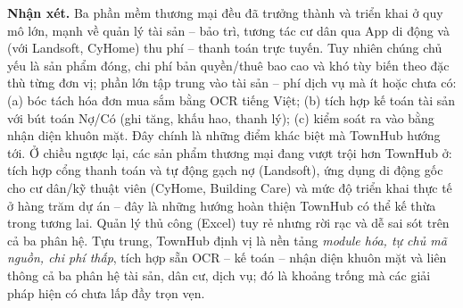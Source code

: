 \textbf{Nhận xét.} Ba phần mềm thương mại đều đã trưởng thành và triển khai ở quy mô lớn, mạnh về quản lý tài sản -- bảo trì, tương tác cư dân qua App di động và (với Landsoft, CyHome) thu phí -- thanh toán trực tuyến. Tuy nhiên chúng chủ yếu là sản phẩm đóng, chi phí bản quyền/thuê bao cao và khó tùy biến theo đặc thù từng đơn vị; phần lớn tập trung vào tài sản -- phí dịch vụ mà ít hoặc chưa có: (a) bóc tách hóa đơn mua sắm bằng OCR tiếng Việt; (b) tích hợp kế toán tài sản với bút toán Nợ/Có (ghi tăng, khấu hao, thanh lý); (c) kiểm soát ra vào bằng nhận diện khuôn mặt. Đây chính là những điểm khác biệt mà TownHub hướng tới. Ở chiều ngược lại, các sản phẩm thương mại đang vượt trội hơn TownHub ở: tích hợp cổng thanh toán và tự động gạch nợ (Landsoft), ứng dụng di động gốc cho cư dân/kỹ thuật viên (CyHome, Building Care) và mức độ triển khai thực tế ở hàng trăm dự án -- đây là những hướng hoàn thiện TownHub có thể kế thừa trong tương lai. Quản lý thủ công (Excel) tuy rẻ nhưng rời rạc và dễ sai sót trên cả ba phân hệ. Tựu trung, TownHub định vị là nền tảng \textit{module hóa, tự chủ mã nguồn, chi phí thấp}, tích hợp sẵn OCR -- kế toán -- nhận diện khuôn mặt và liên thông cả ba phân hệ tài sản, dân cư, dịch vụ; đó là khoảng trống mà các giải pháp hiện có chưa lấp đầy trọn vẹn.

